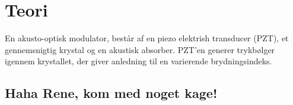 \documentclass[main]{subfiles}
\begin{document}
\section{Teori}
En akusto-optisk modulator, består af en piezo elektrish transducer (PZT), et gennemsnigtig krystal og en akustisk absorber. PZT'en generer trykbølger igennem krystallet, der giver anledning til en varierende brydningsindeks. 






\subsection{Haha Rene, kom med noget kage!}
\end{document}
